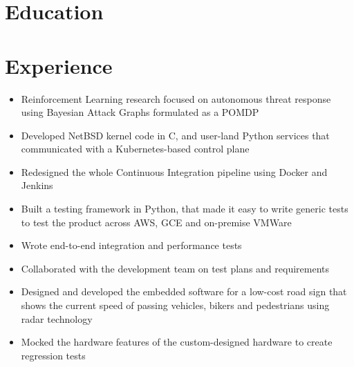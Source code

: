 \documentclass{cv_doc}
\begin{document}
\vspace{0.8cm}

\section*{Education}


\vspace{0.25cm}

\section*{Experience}


\begin{itemize}[label={\tiny\raisebox{1ex}{\textbullet}}]
  \item {Reinforcement Learning research focused on autonomous threat response using Bayesian Attack Graphs formulated as a POMDP}
  \item {Developed NetBSD kernel code in C, and user-land Python services that
  communicated with a Kubernetes-based control plane}
\end{itemize}


\begin{itemize}[label={\tiny\raisebox{1ex}{\textbullet}}]
  \item {Redesigned the whole Continuous Integration pipeline using Docker and
  Jenkins}
  \item {Built a testing framework in Python, that made it easy to write
  generic tests to test the product across AWS, GCE and on-premise VMWare}
  \item {Wrote end-to-end integration and performance tests}
  \item {Collaborated with the development team on test plans and requirements}
\end{itemize}


\begin{itemize}[label={\tiny\raisebox{1ex}{\textbullet}}]
  \item {Designed and developed the embedded software for a low-cost road sign
  that shows the current speed of passing vehicles, bikers and pedestrians
  using radar technology}
  \item {Mocked the hardware features of the custom-designed hardware to create
  regression tests}
\end{itemize}
\end{document}
